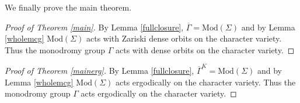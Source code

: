 \documentclass{article}
\newcommand{\Mod}{\textrm{Mod}}
\begin{document}
We finally prove the main theorem.
\begin{proof}[Proof of Theorem \ref{main}]
By Lemma \ref{fullclosure}, $\overline{\Gamma} = \Mod(\Sigma)$ and by Lemma \ref{wholemcg} $\Mod(\Sigma)$ acts with Zariski dense orbits on the character variety. Thus the monodromy group $\Gamma$ acts with dense orbits on the character variety.
\end{proof}

\begin{proof}[Proof of Theorem \ref{mainerg}]
    By Lemma \ref{fullclosure}, $\overline{\Gamma}^K = \Mod(\Sigma)$ and by Lemma \ref{wholemcg} $\Mod(\Sigma)$ acts ergodically on the character variety. Thus the monodromy group $\Gamma$ acts ergodically on the character variety.
\end{proof}



\end{document}
